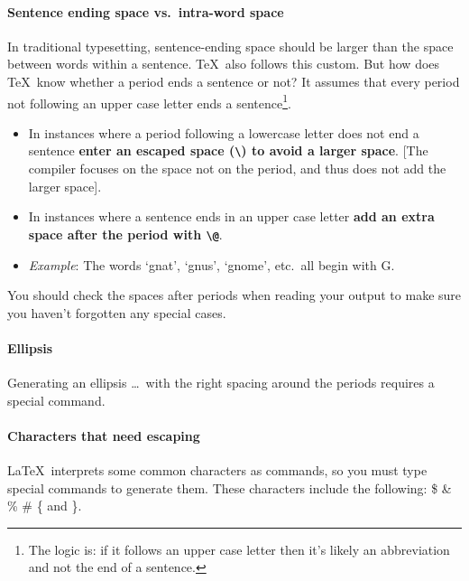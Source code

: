 \documentclass{article}      %
\begin{document}
\paragraph{Sentence ending space vs.\ intra-word space}

In traditional typesetting, sentence-ending space should be larger than the space between words
within a sentence. \TeX\ also follows this custom. But how does \TeX\ know whether a period ends a
sentence or not? It assumes that every period not following an upper case letter ends a
sentence\footnote{The logic is: if it follows an upper case letter then it's likely an abbreviation
and not the end of a sentence.}.

\begin{itemize}

\item In instances where a period following a lowercase letter does not end a sentence 
      \textbf{enter an escaped space ({\tt \textbackslash \textvisiblespace }) to avoid a larger
       space}. [The compiler focuses on the space not on the period, and thus does not add the
       larger space]. 

\item In instances where a sentence ends in an upper case letter 
      \textbf{add an extra space after the period with {\tt \textbackslash @}}.

\item \emph{Example}: The words `gnat', `gnus', `gnome', etc.\ all begin with G\@.

\end{itemize}

You should check the spaces after periods when reading your output to make sure you haven't
forgotten any special cases.  

\paragraph{Ellipsis} Generating an ellipsis \ldots\ with the right spacing around the periods
 requires a special command.

\paragraph{Characters that need escaping} \LaTeX\ interprets some common characters as commands, so
 you must type special commands to generate them.  These characters include the following:
       \$ \& \% \# \{ and \}.
\end{document}
